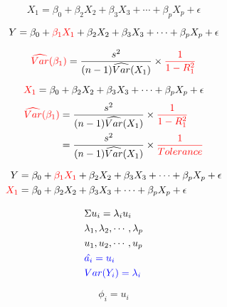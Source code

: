 $$ X_1 = \beta_0 + \beta_2 X_2 + \beta_3 X_3 + \cdots + \beta_p X_p + \epsilon$$ 


$$ Y = \beta_0 + \textcolor{red}{\beta_1 X_1} + \beta_2 X_2 + \beta_3 X_3 + \cdots + \beta_p X_p + \epsilon$$ 

$$\textcolor{red}{\widehat{Var}(\beta_1)}  =  \frac{s^2}{(n-1)\widehat{Var}(X_1)} \times \textcolor{red}{\frac{1}{1 - R^2_1}}$$

$$ \textcolor{red}{X_1} = \beta_0 + \beta_2 X_2 + \beta_3 X_3 + \cdots + \beta_p X_p + \epsilon$$ 
\begin{align*}
\textcolor{red}{\widehat{Var}(\beta_1)} & =  \frac{s^2}{(n-1)\widehat{Var}(X_1)} \times \textcolor{red}{\frac{1}{1 - R^2_1}} \\
 & = \frac{s^2}{(n-1)\widehat{Var}(X_1)} \times \textcolor{red}{\frac{1}{Tolerance}} 
\end{align*}

\begin{align*}
Y  &= \beta_0 + \textcolor{red}{\beta_1 X_1} + \beta_2 X_2 + \beta_3 X_3 + \cdots + \beta_p X_p + \epsilon  \\
\textcolor{red}{X_1} &= \beta_0 + \beta_2 X_2 + \beta_3 X_3 + \cdots + \beta_p X_p + \epsilon 
\end{align*}


\begin{align*}
& \Sigma u_i  = \lambda_i  u_i\\
& \lambda_1, \lambda_2, \cdots, \lambda_p \\
& u_1, u_2, \cdots,  u_p \\
& \textcolor{blue}{\hat{a_i} =  u_i} \\
& \textcolor{blue}{Var(Y_i) = \lambda_i}
\end{align*}

$$\phi_i = u_i$$

